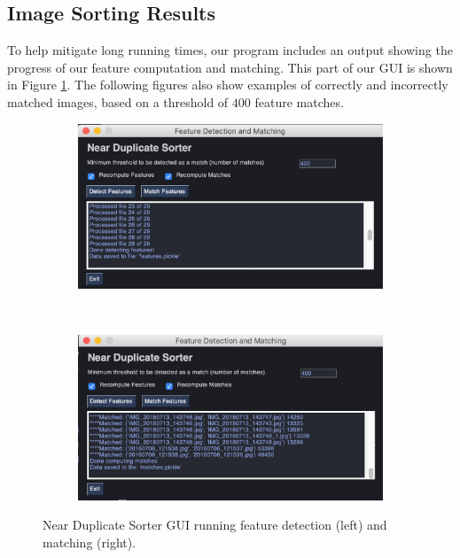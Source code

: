 \documentclass[12pt]{article}
\begin{document}
\subsection{Image Sorting Results}
To help mitigate long running times, our program includes an output showing the progress of our feature computation and matching. This part of our GUI is shown in Figure \ref{fig:sort_gui}. The following figures also show examples of correctly and incorrectly matched images, based on a threshold of $400$ feature matches.
\begin{figure}[H]
	\centering
	\begin{subfigure}[b]{.5\textwidth}
	\includegraphics[width=1\textwidth]{images/near_duplicate_GUI1.png}
	\end{subfigure}%
	~
	\begin{subfigure}[b]{.5\textwidth}
		\includegraphics[width=1\textwidth]{images/near_duplicate_GUI2.png}
	\end{subfigure}

	\caption{Near Duplicate Sorter GUI running feature detection (left) and matching (right).}
		\label{fig:sort_gui}
\end{figure}
\end{document}
